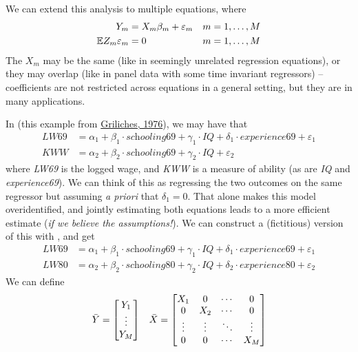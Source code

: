 \documentclass[10pt]{article}
\begin{document}
\begin{remark}
	We can extend this analysis to multiple equations, where 
	\begin{align*}
		Y_m &= X_m\beta_m + \varepsilon_m &&m = 1,\dots,M \\
		\mathbb{E} Z_m \varepsilon_m &= 0 &&m=1,\dots,M
	\end{align*}
	The $X_m$ may be the same (like in seemingly unrelated regression equations), or they may overlap (like in panel data with some time invariant regressors) -- coefficients are not restricted across equations in a general setting, but they are in many applications.
\end{remark}

\begin{example}
	In  (this example from \href{https://www.jstor.org/stable/1831103?seq=1}{Griliches, 1976}), we may have that 
	\begin{align*}
		\textit{LW69} &= \alpha_1 + \beta_1 \cdot \textit{schooling69} + \gamma_1 \cdot \textit{IQ} + \delta_1 \cdot \textit{experience69} + \varepsilon_1 \\ \textit{KWW} &= \alpha_2 + \beta_2 \cdot  \textit{schooling69} + \gamma_2 \cdot \textit{IQ} + \varepsilon_2
	\end{align*}
	where \textit{LW69} is the logged wage, and \textit{KWW} is a measure of ability (as are \textit{IQ} and \textit{experience69}). We can think of this as regressing the two outcomes on the same regressor but assuming \emph{a priori} that $\delta_1 = 0$. That alone makes this model overidentified, and jointly estimating both equations leads to a more efficient estimate (\emph{if we believe the assumptions!}). We can construct a (fictitious) version of this with , and get
	\begin{align*}
		\textit{LW69} &= \alpha_1 + \beta_1 \cdot \textit{schooling69} + \gamma_1 \cdot \textit{IQ} + \delta_1 \cdot \textit{experience69} + \varepsilon_1 \\
		\textit{LW80} &= \alpha_2 + \beta_2 \cdot \textit{schooling80} + \gamma_2 \cdot \textit{IQ} + \delta_2 \cdot \textit{experience80} + \varepsilon_2
	\end{align*}
	We can define
	\begin{align*}
		\bar{Y} &= \matrixc{Y_1 \\ \vdots \\ Y_M} &&\bar{X} = \matrixc{X_1 & 0 & \cdots & 0 \\0 & X_2 & \cdots & 0 \\ \vdots & \vdots & \ddots & \vdots \\ 0 & 0 & \cdots & X_M} \\

\end{align*}
\end{example}
\end{document}
